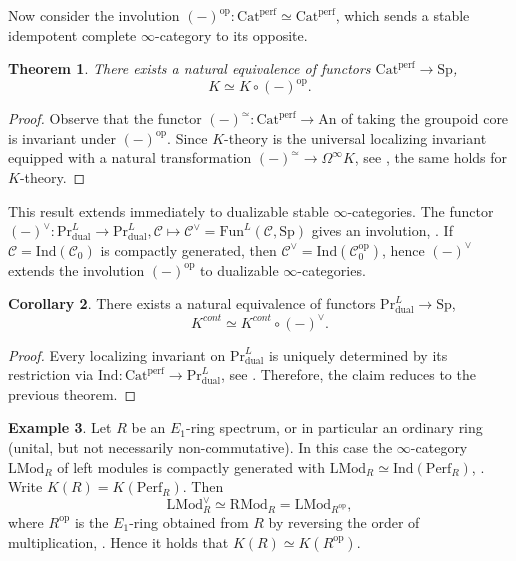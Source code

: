 \documentclass[10pt]{amsart}
\newtheorem{theorem}{Theorem}
\theoremstyle{definition}
\newtheorem{corollary}[theorem]{Corollary}
\newtheorem{example}[theorem]{Example}
\newcommand{\Fun}{\text{Fun}}
\newcommand{\Sp}{\mathrm{Sp}}
\newcommand{\An}{\mathrm{An}}
\newcommand{\Cat}{\mathrm{Cat}}
\newcommand{\PR}{\mathrm{Pr}}
\newcommand{\Ind}{\mathrm{Ind}}
\newcommand{\perf}{\mathrm{perf}}
\newcommand{\op}{\mathrm{op}}
\newcommand{\dual}{\mathrm{dual}}
\begin{document}
Now consider the involution $(-)^{\op} : \Cat^\perf \simeq \Cat^\perf$, which sends a stable idempotent complete $\infty$-category to its opposite.

\begin{theorem}
There exists a natural equivalence of functors $ \Cat^\perf \rightarrow \Sp$,
\[ K \simeq K \circ (-)^{\op}. \]
\end{theorem}

\begin{proof}
Observe that the functor $(-)^{\simeq} : \Cat^\perf \rightarrow \An$ of taking the groupoid core is invariant under $(-)^{\op}$. Since $K$-theory is the universal localizing invariant equipped with a natural transformation $(-)^{\simeq} \rightarrow \Omega^\infty K$, see \cite{blumberg_gepner_tabuada}, the same holds for $K$-theory.
\end{proof}

This result extends immediately to dualizable stable $\infty$-categories. The functor $(-)^\vee : \PR^L_{\dual} \rightarrow \PR^L_{\dual}, \mathcal{C} \mapsto \mathcal{C}^\vee = \Fun^L(\mathcal{C}, \Sp)$ gives an involution, \cite[Section 1.7]{efimov2025ktheorylocalizinginvariantslarge}. If $\mathcal{C} = \Ind(\mathcal{C}_0)$ is compactly generated, then $\mathcal{C}^\vee = \Ind(\mathcal{C}_0^{\op})$, hence $(-)^\vee$ extends the involution $(-)^{\op}$ to dualizable $\infty$-categories.

\begin{corollary}
There exists a natural equivalence of functors $ \PR^L_{\dual} \rightarrow \Sp$,
\[ K^{cont} \simeq K^{cont} \circ (-)^\vee. \]
\end{corollary}

\begin{proof}
Every localizing invariant on  $ \PR^L_{\dual} $ is uniquely determined by its restriction via $\Ind :  \Cat^\perf \rightarrow \PR^L_{\dual} $, see \cite[Theorem 4.10]{efimov2025ktheorylocalizinginvariantslarge}. Therefore, the claim reduces to the previous theorem.
\end{proof}

\begin{example}
Let $R$ be an $E_1$-ring spectrum, or in particular an ordinary ring (unital, but not necessarily non-commutative). In this case the $\infty$-category $\mathrm{LMod}_R$ of left modules is compactly generated with $\mathrm{LMod}_R \simeq \mathrm{Ind}(\mathrm{Perf}_R)$, \cite[Proposition 7.2.4.2]{lurieha}. Write $K(R) = K(\mathrm{Perf}_R)$. Then
\[\mathrm{LMod}_R^\vee \simeq \mathrm{RMod}_R = \mathrm{LMod}_{R^{\op}},\] where $R^{\op}$ is the $E_1$-ring obtained from $R$ by reversing the order of multiplication, \cite[Proposition 7.2.4.3]{lurieha}. Hence it holds that $K(R) \simeq K(R^{\op})$.
\end{example}
\end{document}
